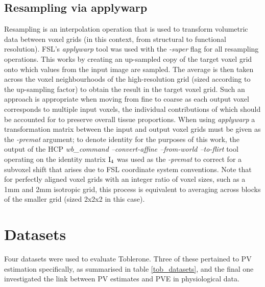 \subsection*{Resampling via applywarp}
\label{applywarp}
Resampling is an interpolation operation that is used to transform volumetric data between voxel grids (in this context, from structural to functional resolution). FSL’s \textit{applywarp} tool was used with the \textit{-super} flag for all resampling operations. This works by creating an up-sampled copy of the target voxel grid onto which values from the input image are sampled. The average is then taken across the voxel neighbourhoods of the high-resolution grid (sized according to the up-sampling factor) to obtain the result in the target voxel grid. Such an approach is appropriate when moving from fine to coarse as each output voxel corresponds to multiple input voxels, the individual contributions of which should be accounted for to preserve overall tissue proportions. When using \textit{applywarp} a transformation matrix between the input and output voxel grids must be given as the \textit{-premat} argument; to denote identity for the purposes of this work, the output of the HCP \textit{wb\_command –convert-affine –from-world –to-flirt} tool operating on the identity matrix $\mathrm{I}_4$ was used as the \textit{-premat} to correct for a subvoxel shift that arises due to FSL coordinate system conventions. Note that for perfectly aligned voxel grids with an integer ratio of voxel sizes, such as a 1mm and 2mm isotropic grid, this process is equivalent to averaging across blocks of the smaller grid (sized 2x2x2 in this case).

\section{Datasets}

Four datasets were used to evaluate Toblerone. Three of these pertained to PV estimation specifically, as summarised in table \ref{tob_datasets}, and the final one investigated the link between PV estimates and PVE in physiological data.

